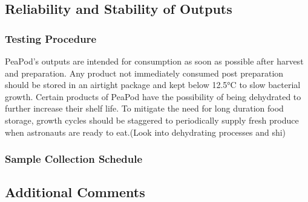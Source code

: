 \subsection{Reliability and Stability of Outputs}


\subsubsection{Testing Procedure}

PeaPod's outputs are intended for consumption as soon as possible after harvest and preparation. Any product not immediately consumed post preparation should be stored in an airtight package and kept below 12.5°C to slow bacterial growth. Certain products of PeaPod have the possibility of being dehydrated to further increase their shelf life. 
To mitigate the need for long duration food storage, growth cycles should be staggered to periodically supply fresh produce when astronauts are ready to eat.(Look into dehydrating processes and shi)


\subsubsection{Sample Collection Schedule}




\clearpage

\subsection{Additional Comments}


\clearpage

